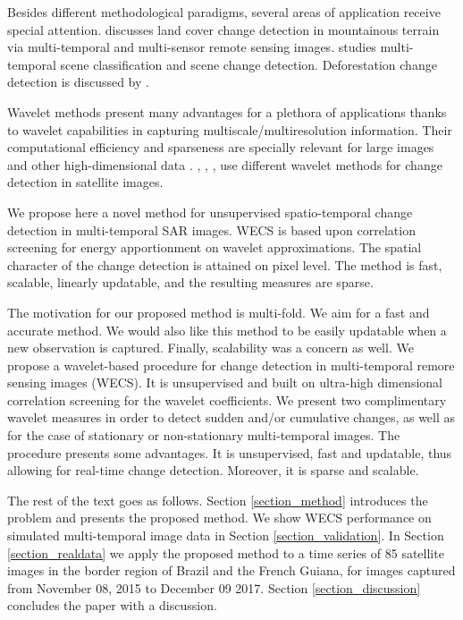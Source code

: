 \documentclass[journal]{IEEEtran}
\begin{document}
Besides different methodological paradigms, several areas of application receive special attention.  \cite{song2018multi} discusses land cover change detection in mountainous terrain via multi-temporal and multi-sensor remote sensing images. \cite{ru2021multi} studies multi-temporal scene classification and scene change detection. Deforestation change detection is discussed by \cite{barreto2016deforestation}. 

Wavelet methods present many advantages for a plethora of applications \cite{vidakovic1999statistical} thanks to wavelet capabilities in capturing multiscale/multiresolution information. Their computational efficiency and sparseness are specially relevant for large images and other high-dimensional data \cite{morettin2017wavelets}. \cite{atto2012multidate}, \cite{bouhlel2015multivariate}, \cite{celik2009multiscale}, \cite{cui2012statistical} use different wavelet methods for change detection in satellite images. 

We propose here a novel method for unsupervised spatio-temporal change detection in multi-temporal SAR images. WECS is based upon correlation screening for energy apportionment on wavelet approximations. The spatial character of the change detection is attained on pixel level. The method is fast, scalable, linearly updatable, and the resulting measures are sparse. 

The motivation for our proposed method is multi-fold. We aim for a fast and accurate method. We would also like this method to be easily updatable when a new observation is captured. Finally, scalability was a concern as well. We propose a wavelet-based procedure for change detection in multi-temporal remore sensing images (WECS). It is unsupervised and built on ultra-high dimensional correlation screening \cite{fan2020statistical} for the wavelet coefficients.  We present two complimentary wavelet measures in order to detect sudden and/or cumulative changes, as well as for the case of stationary or non-stationary multi-temporal images. The procedure presents some advantages. It is unsupervised, fast and updatable, thus allowing for real-time change detection. Moreover, it is sparse and scalable. 

The rest of the text goes as follows. Section \ref{section_method} introduces the problem and presents the proposed method. We show WECS performance on simulated multi-temporal image data in Section \ref{section_validation}. In Section \ref{section_realdata} we apply the proposed method to a time series of 85 satellite images in the border region of Brazil and the French Guiana, for  images captured from November 08, 2015 to December 09 2017.  Section \ref{section_discussion} concludes the paper with a discussion.
\end{document}
